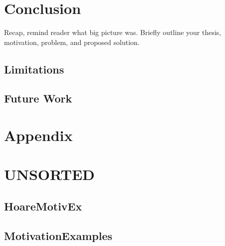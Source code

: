 

\chapter{Conclusion}
Recap, remind reader what big picture was.
Briefly outline your thesis, motivation, problem, and proposed solution.

\section{Limitations}

\section{Future Work}


\chapter{Appendix}


\chapter{UNSORTED}

\section{HoareMotivEx}
\label{sec:hoaremotivex}


\section{MotivationExamples}
\label{sec:motivationexamples}

